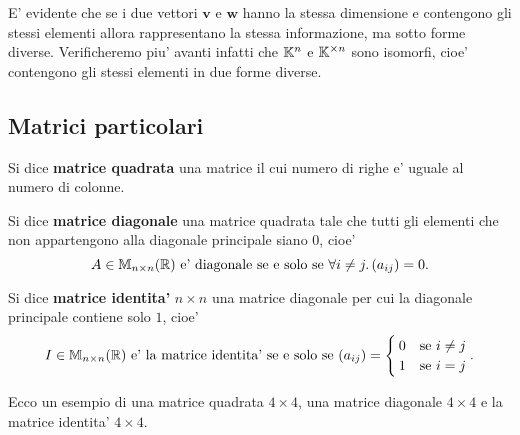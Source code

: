 E' evidente che se i due vettori $\bm{v}$ e $\bm{w}$ hanno la stessa dimensione e contengono gli stessi elementi allora rappresentano la stessa informazione, ma sotto forme diverse. Verificheremo piu' avanti infatti che $\mathbb{K}^n$ e $\mathbb{K}^{\times n}$ sono isomorfi, cioe' contengono gli stessi elementi in due forme diverse.

\subsection{Matrici particolari}

\begin{definition}
    Si dice \textbf{matrice quadrata} una matrice il cui numero di righe e' uguale al numero di colonne.
\end{definition}

\begin{definition}
    Si dice \textbf{matrice diagonale} una matrice quadrata tale che tutti gli elementi che non appartengono alla diagonale principale siano $0$, cioe'
    \begin{equation}
        A \in \mathbb{M}_{n \times n}(\mathbb{R}) \text{ e' diagonale se e solo se } \forall i \neq j. \, (a_{ij}) = 0.
    \end{equation}
\end{definition}

\begin{definition}
    Si dice \textbf{matrice identita'} $n \times n$ una matrice diagonale per cui la diagonale principale contiene solo $1$, cioe'
    \begin{equation}
        I \in \mathbb{M}_{n \times n}(\mathbb{R}) \text{ e' la matrice identita' se e solo se } (a_{ij}) = \begin{cases}
            0   &\text{se } i \neq j \\
            1   &\text{se } i = j \\
        \end{cases}.
    \end{equation}
\end{definition}

Ecco un esempio di una matrice quadrata $4 \times 4$, una matrice diagonale $4 \times 4$ e la matrice identita' $4 \times 4$.

